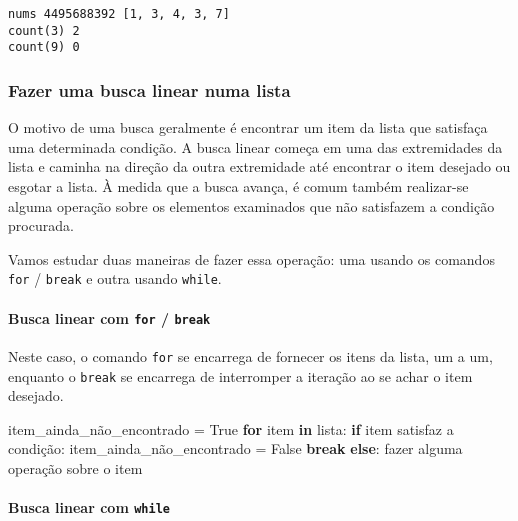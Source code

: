 \documentclass[11pt,a4paper]{article}
\newenvironment{Shaded}{}{}
\newcommand{\KeywordTok}[1]{\textcolor[rgb]{0.00,0.44,0.13}{\textbf{{#1}}}}
\newcommand{\NormalTok}[1]{{#1}}
\newcommand{\VariableTok}[1]{\textcolor[rgb]{0.10,0.09,0.49}{{#1}}}
\newcommand{\ControlFlowTok}[1]{\textcolor[rgb]{0.00,0.44,0.13}{\textbf{{#1}}}}
\newcommand{\OperatorTok}[1]{\textcolor[rgb]{0.40,0.40,0.40}{{#1}}}
\begin{document}
    \begin{Verbatim}[commandchars=\\\{\}]
nums 4495688392 [1, 3, 4, 3, 7]
count(3) 2
count(9) 0

    \end{Verbatim}

    \subsubsection{Fazer uma busca linear numa
lista}\label{fazer-uma-busca-linear-numa-lista}

O motivo de uma busca geralmente é encontrar um item da lista que
satisfaça uma determinada condição. A busca linear começa em uma das
extremidades da lista e caminha na direção da outra extremidade até
encontrar o item desejado ou esgotar a lista. À medida que a busca
avança, é comum também realizar-se alguma operação sobre os elementos
examinados que não satisfazem a condição procurada.

Vamos estudar duas maneiras de fazer essa operação: uma usando os
comandos \texttt{for} / \texttt{break} e outra usando \texttt{while}.

    \paragraph{\texorpdfstring{Busca linear com \texttt{for} /
\texttt{break}}{Busca linear com for / break}}\label{busca-linear-com-for-break} 

Neste caso, o comando \texttt{for} se encarrega de fornecer os itens da
lista, um a um, enquanto o \texttt{break} se encarrega de interromper a
iteração ao se achar o item desejado.

\begin{Shaded}
\begin{Highlighting}[]
\NormalTok{item_ainda_não_encontrado }\OperatorTok{=} \VariableTok{True}
\ControlFlowTok{for}\NormalTok{ item }\KeywordTok{in}\NormalTok{ lista:}
    \ControlFlowTok{if}\NormalTok{ item satisfaz a condição:}
\NormalTok{        item_ainda_não_encontrado }\OperatorTok{=} \VariableTok{False}
        \ControlFlowTok{break}
    \ControlFlowTok{else}\NormalTok{:}
\NormalTok{        fazer alguma operação sobre o item}
\end{Highlighting}
\end{Shaded}

    \paragraph{\texorpdfstring{Busca linear com
\texttt{while}}{Busca linear com while}}\label{busca-linear-com-while}
\end{document}
